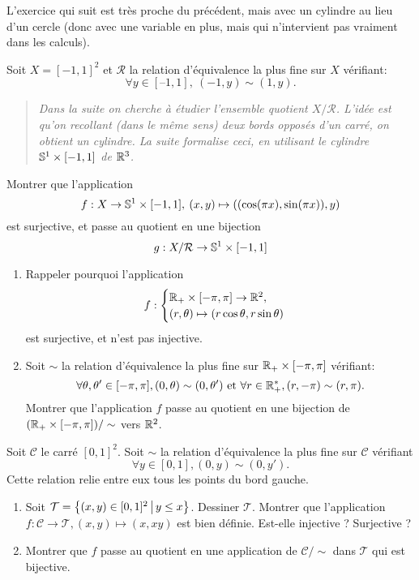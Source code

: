L'exercice qui suit est très proche du précédent, mais avec un cylindre au lieu d'un cercle (donc avec une variable en plus, mais qui n'intervient pas vraiment dans les calculs).

\begin{exercice}
Soit $X=[-1,1]^2$ et $\mathcal R$ la relation d'équivalence la plus fine sur $X$ vérifiant:
\[ \forall y\in [–1,1], \: (-1,y)\sim (1,y).\]
\begin{quote}
\emph{Dans la suite on cherche à étudier l'ensemble quotient $X/\mathcal R$. L'idée est qu'on recollant (dans le même sens) deux bords opposés d'un carré, on obtient un cylindre. La suite formalise ceci, en utilisant le cylindre $\S^1\times [-1,1]$ de $\R^3$.}
\end{quote}
Montrer que l'application
\[ f : X \to \S^1\times [-1,1], \: (x,y) \mapsto ((\cos(\pi x), \sin(\pi x)), y)\]
est surjective, et passe au quotient en une bijection
\[ g : X/\mathcal R \to \S^1\times [-1,1]\]
\end{exercice}


\begin{exercice}
\begin{enumerate}
\item Rappeler pourquoi l'application
\[ f : \begin{cases}\R_+\times [-\pi,\pi] \to \R^2,\\  (r,\theta) \mapsto (r\cos\theta,r\sin\theta)\end{cases}\]
est surjective, et n'est pas injective.
\item Soit $\sim$ la relation d'équivalence la plus fine sur $\R_+\times [-\pi,\pi]$ vérifiant: 
\[
\forall \theta,\theta'\in [-\pi,\pi], (0,\theta)\sim (0,\theta')  \text{ et  } \forall r\in \R_+^*, (r,-\pi)\sim (r,\pi).
\]
Montrer que l'application $f$ passe au quotient en une bijection  de $(\R_+\times [-\pi,\pi]) / \sim$ vers $\R^2$.
\end{enumerate}
\end{exercice}



\begin{exercice}
Soit $\mathcal C$ le \og carré\fg{} $[0,1]^2$. Soit $\sim$ la relation d'équivalence la plus fine sur $\mathcal C$ vérifiant
\[ \forall y\in [0,1], (0,y)\sim (0,y').\]
Cette relation relie entre eux tous les points du \og bord gauche\fg.
\begin{enumerate}
\item Soit $\mathcal T=\ensemble{(x,y)\in [0,1]^2}{y\leq x}$. Dessiner $\mathcal T$. Montrer que l'application $f : \mathcal C\to \mathcal T, (x,y)\mapsto (x,xy) $ est bien définie. Est-elle injective ? Surjective ? 
\item Montrer que $f$ passe au quotient en une application de $\mathcal C/\sim$ dans $\mathcal T$ qui est bijective.
\end{enumerate}
\end{exercice}





